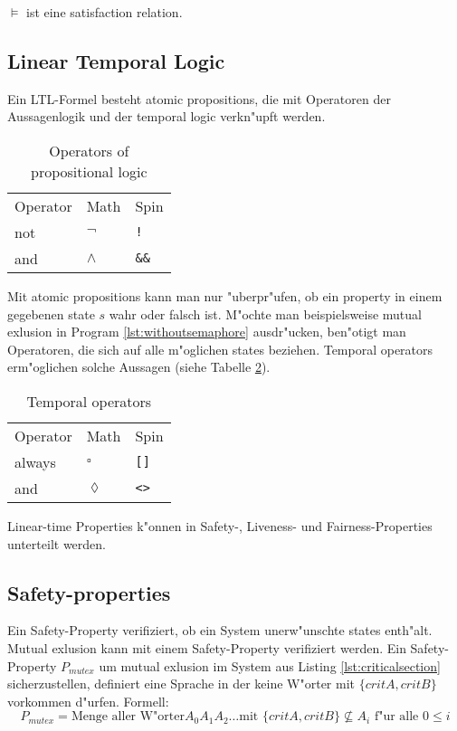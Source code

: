 \documentclass[11pt,twoside,a4paper]{article}
\begin{document}
$ \models $ ist eine satisfaction relation. 


\subsection{Linear Temporal Logic}
\label{sec:lineartemporallogic}

Ein LTL-Formel besteht atomic propositions, die mit Operatoren der Aussagenlogik  und der temporal logic verkn"upft werden.

\begin{table}
  \centering

  \begin{tabular}{l l l}
    Operator & Math & Spin \\
    not & $\neg$ & \verb|!| \\
    and & $\land$ & \verb|&&| \\
  \end{tabular}
  \caption{Operators of propositional logic }
  \label{tab:operators_of_propositionallogic}
\end{table}

Mit atomic propositions kann man nur "uberpr"ufen, ob ein property in einem gegebenen state $s$ wahr oder falsch ist. M"ochte man beispielsweise mutual exlusion in Program \ref{lst:withoutsemaphore} ausdr"ucken, ben"otigt man Operatoren, die sich auf alle m"oglichen states beziehen. Temporal operators erm"oglichen solche Aussagen (siehe Tabelle \ref{tab:temporal_operators}). 

\begin{table}
  \centering
  \begin{tabular}{l l l}
    Operator & Math & Spin \\
    always & $\square$ & \verb|[]| \\
    and & $\lozenge$ & \verb|<>| \\
  \end{tabular}
  \caption{Temporal operators }
  \label{tab:temporal_operators}
\end{table}

Linear-time Properties k"onnen in Safety-, Liveness- und Fairness-Properties unterteilt werden.

\subsection{Safety-properties}
\label{sec:safety}

Ein Safety-Property verifiziert, ob ein System unerw"unschte states enth"alt. Mutual exlusion kann mit einem Safety-Property verifiziert werden. Ein Safety-Property $P_{mutex}$ um mutual exlusion im System aus Listing \ref{lst:criticalsection} sicherzustellen, definiert eine Sprache in der keine W"orter mit $\{critA,critB\}$ vorkommen d"urfen. Formell:
\[
P_{mutex} = \text{Menge aller W"orter} A_0 A_1 A_2 \dots \text{mit } \{critA,critB\} \not \subseteq A_i \text{ f"ur alle } 0 \leq i
\]
\end{document}
